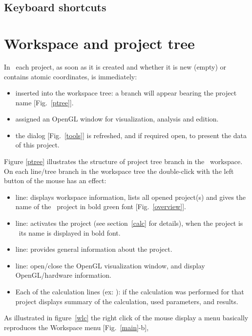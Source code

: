 \subsection*{Keyboard shortcuts}
\vspace{0.5cm}
\kbdmain
\clearpage

\section{Workspace and project tree}

In \atomes\ each project, as soon as it is created and whether it is new (empty) or contains atomic coordinates, is immediately:
\begin{itemize}
\item inserted into the workspace tree: a branch will appear bearing the project name [Fig.~\ref{ptree}].
\item assigned an OpenGL window for visualization, analysis and edition. 
\item the  dialog [Fig.~\ref{tools}] is refreshed, and if required open, to present the data of this project.
\end{itemize}
Figure \ref{ptree} illustrates the structure of project tree branch in the \atomes\ workspace. \\
\treefig
\laf On each line/tree branch in the workspace tree the double-click with the left button of the mouse has an effect: 
\begin{itemize}
\item {} line: displays workspace information, lists all opened project(s) and gives the name of the \activp\ project in bold green font [Fig.~\ref{overview}].
\item {} line: activates the project (see section~\ref{calc} for details), when the project is \activp\ its name is displayed in bold font.
\item {} line: provides general information about the project.
\item {} line: open/close the OpenGL visualization window, and display OpenGL/hardware information. 
\item Each of the calculation lines (ex: ): if the calculation was performed for that project displays summary of the calculation, used parameters, and results. 
\end{itemize}
As illustrated in figure~\ref{wlc} the right click of the mouse display a menu basically reproduces the Workspace menu [Fig.~\ref{main}-b], 
